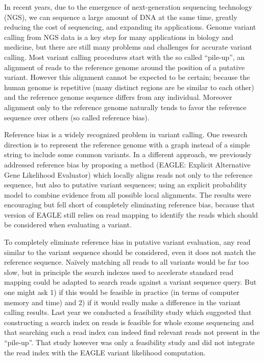 In recent years, due to the emergence of next-generation sequencing technology (NGS), we can sequence a large amount of DNA at the same time, greatly reducing the cost of sequencing, and expanding its applications.  Genome variant calling from NGS data is a key step for many applications in biology and medicine, but there are still many problems and challenges for accurate variant calling.  Most variant calling procedures start with the so called ``pile-up'', an alignment of reads to the reference genome around the position of a putative variant.  However this alignment cannot be expected to be certain; because the human genome is repetitive (many distinct regions are be similar to each other) and the reference genome sequence differs from any individual.  Moreover alignment only to the reference genome naturally tends to favor the reference sequence over others (so called reference bias).

Reference bias is a widely recognized problem in variant calling.  One research direction is to represent the reference genome with a graph instead of a simple string to include some common variants.  In a different approach, we previously addressed reference bias by proposing a method (EAGLE: Explicit Alternative Gene Likelihood Evaluator) which locally aligns reads not only to the reference sequence, but also to putative variant sequences; using an explicit probability model to combine evidence from all possible local alignments.  The results were encouraging but fell short of completely eliminating reference bias, because that version of EAGLE still relies on read mapping to identify the reads which should be considered when evaluating a variant.

To completely eliminate reference bias in putative variant evaluation, any read similar to the variant sequence should be considered, even it does not match the reference sequence.  Na\"ively matching all reads to all variants would be far too slow, but in principle the search indexes used to accelerate standard read mapping could be adapted to search reads against a variant sequence query.  But one might ask 1) if this would be feasible in practice (in terms of computer memory and time) and 2) if it would really make a difference in the variant calling results.  Last year we conducted a feasibility study which suggested that constructing a search index on reads is feasible for whole exome sequencing and that searching such a read index can indeed find relevant reads not present in the ``pile-up''.  That study however was only a feasibility study and did not integrate the read index with the EAGLE variant likelihood computation.

